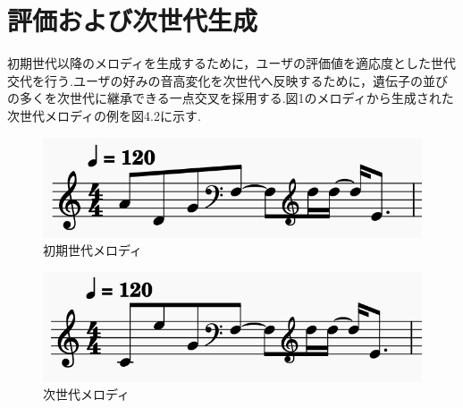 \section{評価および次世代生成}
初期世代以降のメロディを生成するために，ユーザの評価値を適応度とした世代交代を行う.ユーザの好みの音高変化を次世代へ反映するために，遺伝子の並びの多くを次世代に継承できる一点交叉を採用する.図1のメロディから生成された次世代メロディの例を図4.2に示す.

\begin{figure}[htbp]
	\begin{center}
		\includegraphics[scale=0.9]{image/init.png}
		\caption{初期世代メロディ}
	\end{center}
\end{figure}

\begin{figure}[htbp]
	\begin{center}
		\includegraphics[scale=0.9]{image/nextInd.png}
		\caption{次世代メロディ}
	\end{center}
\end{figure}

